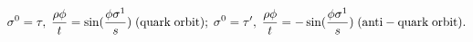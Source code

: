 \begin{equation}
\label{helices}
\sigma^0=\tau,\;\frac{\rho \phi}{t} =\sin (\frac{\phi\sigma^1}{s})\;{\rm (quark\;orbit)};\;\sigma^0=\tau',\;\frac{\rho\phi}{t} =-\sin (\frac{\phi\sigma^1}{s})\;{\rm (anti-quark\;orbit)}.
\end{equation}

